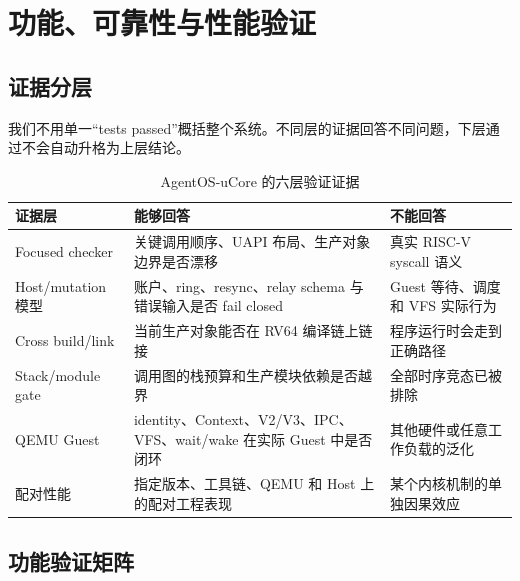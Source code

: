 \chapter{功能、可靠性与性能验证}
\label{chap:validation}

\section{证据分层}

我们不用单一“tests passed”概括整个系统。不同层的证据回答不同问题，下层通过不会自动升格为上层结论。

\begin{table}[htbp]
  \centering
  \caption{AgentOS-uCore 的六层验证证据}
  \label{tab:validation-layers}
  \begin{tabularx}{\textwidth}{L{2.7cm}Y Y}
    \toprule
    证据层 & 能够回答 & 不能回答 \\
    \midrule
    Focused checker & 关键调用顺序、UAPI 布局、生产对象边界是否漂移 & 真实 RISC-V syscall 语义 \\
    Host/mutation 模型 & 账户、ring、resync、relay schema 与错误输入是否 fail closed & Guest 等待、调度和 VFS 实际行为 \\
    Cross build/link & 当前生产对象能否在 RV64 编译链上链接 & 程序运行时会走到正确路径 \\
    Stack/module gate & 调用图的栈预算和生产模块依赖是否越界 & 全部时序竞态已被排除 \\
    QEMU Guest & identity、Context、V2/V3、IPC、VFS、wait/wake 在实际 Guest 中是否闭环 & 其他硬件或任意工作负载的泛化 \\
    配对性能 & 指定版本、工具链、QEMU 和 Host 上的配对工程表现 & 某个内核机制的单独因果效应 \\
    \bottomrule
  \end{tabularx}
\end{table}

\section{功能验证矩阵}

